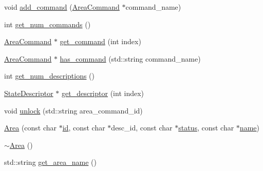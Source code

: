 \begin{DoxyCompactItemize}
\item 
void \hyperlink{class_area_a61f8a73da43dbfa8259a308cb61a28f0}{add\-\_\-command} (\hyperlink{class_area_command}{\-Area\-Command} $\ast$command\-\_\-name)
\item 
int \hyperlink{class_area_a4ba46fedbf3da57ca8bc6de3f50de0a4}{get\-\_\-num\-\_\-commands} ()
\item 
\hyperlink{class_area_command}{\-Area\-Command} $\ast$ \hyperlink{class_area_ad76c8c8174738e806b85b1eb21f89d54}{get\-\_\-command} (int index)
\item 
\hyperlink{class_area_command}{\-Area\-Command} $\ast$ \hyperlink{class_area_a698117843155cede5e11bbe3ff2e20e4}{has\-\_\-command} (std\-::string command\-\_\-name)
\item 
int \hyperlink{class_area_a917fe473912d321f631be8e1b30e5edf}{get\-\_\-num\-\_\-descriptions} ()
\item 
\hyperlink{class_state_descriptor}{\-State\-Descriptor} $\ast$ \hyperlink{class_area_a117aebce322e62d7402e5c36de7475c6}{get\-\_\-descriptor} (int index)
\item 
void \hyperlink{class_area_a6e38f449666617680d0aee968c5c9f57}{unlock} (std\-::string area\-\_\-command\-\_\-id)
\item 
\hyperlink{class_area_aebf5c02afaa711ee4a2d13be7c92b421}{\-Area} (const char $\ast$\hyperlink{class_area_a71dbaaeab0c2f2d0ba296593e59b22ce}{id}, const char $\ast$desc\-\_\-id, const char $\ast$\hyperlink{class_area_ab5b23c6cefb5ff678f5544d7b5900b7b}{status}, const char $\ast$\hyperlink{class_area_a24201719de9d9dfef7a720c036529dd7}{name})
\item 
\hyperlink{class_area_ace0975982b61a16746c564a0d43a4cc8}{$\sim$\-Area} ()
\item 
std\-::string \hyperlink{class_area_aadb3e4eb71211a2bcd495a1b98a0a9d4}{get\-\_\-area\-\_\-name} ()
\end{DoxyCompactItemize}

